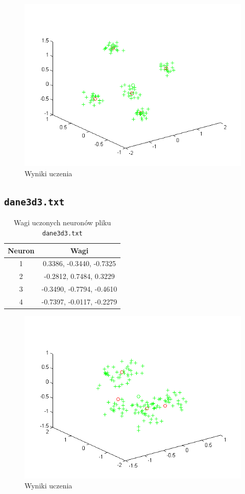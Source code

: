 \documentclass[pointlessnumbers, abstracton, headsepline, a4paper]{scrartcl}
\begin{document}
\begin{figure}[!h]
\centering
\includegraphics[scale=0.8]{src/dane3d2.png}\caption{\label{fig:dane1}Wyniki uczenia}
\end{figure}

\clearpage
\subsection{\texttt{dane3d3.txt}}

\begin{table}[h]
\centering
\begin{tabular}[t]{c|c}
Neuron & Wagi \\
\hline
1&  0.3386,  -0.3440,  -0.7325 \\
2& -0.2812,   0.7484,   0.3229 \\
3& -0.3490,  -0.7794,  -0.4610 \\
4& -0.7397,  -0.0117,  -0.2279 \\
\end{tabular}
\caption{\label{tab:xor}Wagi uczonych neuronów pliku \texttt{dane3d3.txt}}
\end{table}

\begin{figure}[!h]
\centering
\includegraphics[scale=0.8]{src/dane3d3.png}\caption{\label{fig:dane1}Wyniki uczenia}
\end{figure}
\end{document}
